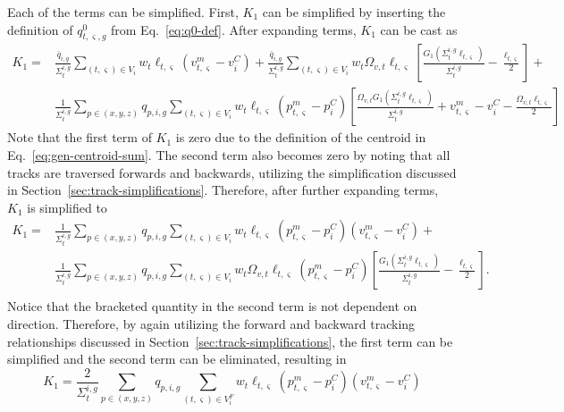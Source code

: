 Each of the terms can be simplified. First, $K_1$ can be simplified by inserting the definition of $q^0_{t,\varsigma,g}$ from Eq.~\ref{eq:q0-def}. After expanding terms, $K_1$ can be cast as
\begin{equation}
\begin{split}
K_1 = &\frac{\overline{q}_{i,g}}{\Sigma_{t}^{i,g}} \sum_{(t,\varsigma) \in V_i} w_t \ell_{t,\varsigma} \left(v^m_{t,\varsigma} - v^C_i \right) + 
\frac{\overline{q}_{i,g}}{\Sigma_{t}^{i,g}} \sum_{(t,\varsigma) \in V_i} w_t \Omega_{v,t} \ell_{t,\varsigma} \left[\frac{G_1(\Sigma_{t}^{i,g} \ell_{t,\varsigma})}{\Sigma_{t}^{i,g}} - \frac{\ell_{t,\varsigma}}{2}\right] + \\
& \frac{1}{\Sigma_{t}^{i,g}} \sum_{p \in (x,y,z)} q_{p,i,g} \sum_{(t,\varsigma) \in V_i} w_t \ell_{t,\varsigma} \left( p^m_{t,\varsigma} - p^C_i \right) \left[\frac{\Omega_{v,t} G_1(\Sigma_{t}^{i,g} \ell_{t,\varsigma})}{\Sigma_{t}^{i,g}} +  v^m_{t,\varsigma} - v^C_i - \frac{\Omega_{v,t} \ell_{t,\varsigma}}{2} \right]
\end{split}
\end{equation}
Note that the first term of $K_1$ is zero due to the definition of the centroid in Eq.~\ref{eq:gen-centroid-sum}. The second term also becomes zero by noting that all tracks are traversed forwards and backwards, utilizing the simplification discussed in Section~\ref{sec:track-simplifications}. Therefore, after further expanding terms, $K_1$ is simplified to 
\begin{equation}
\begin{split}
K_1 = & \frac{1}{\Sigma_{t}^{i,g}} \sum_{p \in (x,y,z)} q_{p,i,g} \sum_{(t,\varsigma) \in V_i} w_t \ell_{t,\varsigma} \left( p^m_{t,\varsigma} - p^C_i \right) \left(v^m_{t,\varsigma} - v^C_i\right) + \\
& \frac{1}{\Sigma_{t}^{i,g}} \sum_{p \in (x,y,z)} q_{p,i,g} \sum_{(t,\varsigma) \in V_i} w_t \Omega_{v,t} \ell_{t,\varsigma} \left( p^m_{t,\varsigma} - p^C_i \right) \left[\frac{G_1(\Sigma_{t}^{i,g} \ell_{t,\varsigma})}{\Sigma_{t}^{i,g}} - \frac{\ell_{t,\varsigma}}{2} \right]. \\
\end{split}
\end{equation}
Notice that the bracketed quantity in the second term is not dependent on direction. Therefore, by again utilizing the forward and backward tracking relationships discussed in Section~\ref{sec:track-simplifications}, the first term can be simplified and the second term can be eliminated, resulting in
\begin{equation}
K_1 = \frac{2}{\Sigma_{t}^{i,g}} \sum_{p \in (x,y,z)} q_{p,i,g} \sum_{(t,\varsigma) \in V^F_i} w_t \ell_{t,\varsigma} \left( p^m_{t,\varsigma} - p^C_i \right) \left(v^m_{t,\varsigma} - v^C_i\right)
\end{equation}
